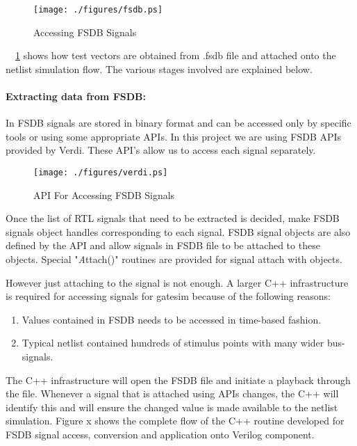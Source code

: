 \begin{figure}[h]
\centering
\texttt{[image: ./figures/fsdb.ps]}
\caption{Accessing FSDB Signals}
\label{fig:fsdb.ps}
\end{figure}

~\figurename{~\ref{fig:fsdb.ps}} shows how test vectors are obtained from .fsdb file and attached onto the netlist simulation flow. The various stages involved are explained below.

\paragraph{Extracting data from FSDB:}In FSDB signals are stored in binary format and can be accessed only by specific tools or using some appropriate APIs.  In this project we are using FSDB APIs provided by Verdi. These API's allow us to access each signal separately. 


\begin{figure}[h]
\centering
\texttt{[image: ./figures/verdi.ps]}
\caption{API For Accessing FSDB Signals}
\label{fig:verdi.eps}
\end{figure}






Once the list of RTL signals that need to be extracted is decided, make FSDB signals object handles corresponding to each signal. FSDB signal objects are also defined by the API and allow signals in FSDB file to be attached to these objects. Special "{\emph Attach()}" routines are provided for signal attach with objects.

However just attaching to the signal is not enough. A larger C++ infrastructure is required for accessing signals for gatesim because of the following reasons:
\begin{enumerate}
\item Values contained in FSDB needs to be accessed in time-based fashion.
\item Typical netlist contained hundreds of stimulus points with many wider bus-signals.
\end{enumerate}
The C++ infrastructure will open the FSDB file and initiate a playback through the file. Whenever a signal that is attached using APIs changes, the C++ will identify this and will ensure the changed value is made available to the netlist simulation.  Figure x shows the complete flow of the C++ routine developed for FSDB signal access, conversion and application onto Verilog component.


